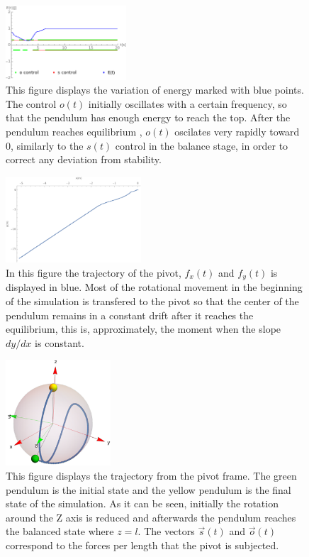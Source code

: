 \documentclass[prd,twocolumn,nofootinbib,showpacs]{revtex4-1}
\begin{document}
\begin{figure}[H]
    \centering
    \includegraphics[width=0.40\textwidth]{Estabilizacaoenergy1.png}
    \caption{This figure displays the variation of energy marked with blue points. The control $o(t)$ initially oscillates with a certain frequency, so that the pendulum has enough energy to reach the top. After the pendulum reaches equilibrium , $o(t)$ oscilates very rapidly toward 0, similarly to the $s(t)$ control in the balance stage, in order to correct any deviation from stability.}
    \label{fig:energy}
\end{figure}

\begin{figure}[H]
    \centering
    \includegraphics[width=0.45\textwidth]{Estabilizacaopos1.pdf}
    \caption{In this figure the trajectory of the pivot, $f_x(t)$ and $f_y(t)$ is displayed in blue. Most of the rotational movement in the beginning of the simulation is transfered to the pivot so that the center of the pendulum remains in a constant drift after it reaches the equilibrium, this is, approximately, the moment when the slope $dy/dx$ is constant.}
    \label{fig:pos}
\end{figure}

\begin{figure}[h]
    \centering
    \includegraphics[width=0.35\textwidth]{Estabilizacao1.png}
    \caption{This figure displays the trajectory from the pivot frame. The green pendulum is the initial state and the yellow pendulum is the final state of the simulation. As it can be seen, initially the rotation around the Z axis is reduced and afterwards the pendulum reaches the balanced state where $z=l$. The vectors $\Vec{s}(t)$ and $\Vec{o}(t)$ correspond to the forces per length that the pivot is subjected.}
    \label{fig:pivotref}
\end{figure}
\end{document}
